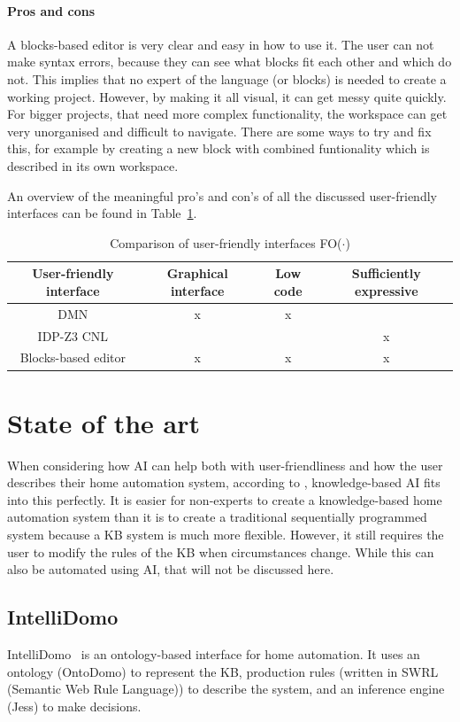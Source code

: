 \documentclass[11pt,a4paper]{report}
\newcommand{\fodot}{FO($\cdot$)\xspace}
\begin{document}
\paragraph{Pros and cons}
A blocks-based editor is very clear and easy in how to use it. The user can not make syntax errors, because they can see what blocks fit each other and which do not. This implies that no expert of the language (or blocks) is needed to create a working project. However, by making it all visual, it can get messy quite quickly. For bigger projects, that need more complex functionality, the workspace can get very unorganised and difficult to navigate. There are some ways to try and fix this, for example by creating a new block with combined funtionality which is described in its own workspace. 

An overview of the meaningful pro's and con's of all the discussed user-friendly interfaces can be found in Table~\ref{tab:user-friendly_comparison}.

\begin{table}
    \centering
    \caption{Comparison of user-friendly interfaces \fodot}
    \label{tab:user-friendly_comparison}
    \begin{tabular}{|c|c|c|c|}
    \hline
    User-friendly interface & Graphical interface & Low code & Sufficiently expressive \\ \hline
    DMN & x & x &   \\ \hline
    IDP-Z3 CNL &  &  & x  \\ \hline
    Blocks-based editor & x & x & x \\ \hline
    \end{tabular}
\end{table}

\section{State of the art}
When considering how AI can help both with user-friendliness and how the user describes their home automation system, according to \cite{SOTA_KnowledgeBasedAIInHomeAutomation}, knowledge-based AI fits into this perfectly. It is easier for non-experts to create a knowledge-based home automation system than it is to create a traditional sequentially programmed system because a KB system is much more flexible. However, it still requires the user to modify the rules of the KB when circumstances change. While this can also be automated using AI, that will not be discussed here.

\subsection{IntelliDomo}
IntelliDomo~\cite{SOTA_OntologyBased} is an ontology-based interface for home automation. It uses an ontology (OntoDomo) to represent the KB, production rules (written in SWRL (Semantic Web Rule Language)) to describe the system, and an inference engine (Jess) to make decisions.
\end{document}
